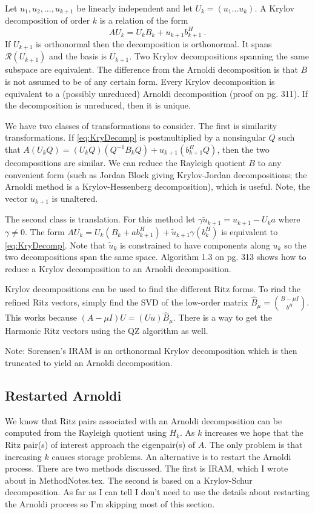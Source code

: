 \documentclass[12pt,twoside]{article}
\newcommand{\cl}[1]{\ensuremath{\mathcal{#1}}}
\begin{document}
Let $u_{1}, u_{2}, ..., u_{k+1}$ be linearly independent and let $U_{k} = (u_{1}...u_{k})$. A Krylov decomposition of order $k$ is a relation of the form 
\begin{equation}
   AU_{k} = U_{k}B_{k} + u_{k+1}b_{k+1}^{H} \:. 
   \label{eq:KryDecomp}
\end{equation}
If $U_{k+1}$ is orthonormal then the decomposition is orthonormal. It spans $\cl{R}(U_{k+1})$ and the basis is $U_{k+1}$. Two Krylov decompositions spanning the same subspace are equivalent. The difference from the Arnoldi decomposition is that $B$ is not assumed to be of any certain form. Every Krylov decomposition is equivalent  to a (possibly unreduced) Arnoldi decomposition (proof on pg. 311). If the decomposition is unreduced, then it is unique. 

We have two classes of transformations to consider. The first is similarity transformations. If \eqref{eq:KryDecomp} is postmultiplied by a nonsingular $Q$ such that $A(U_{k}Q) = (U_{k}Q)(Q^{-1}B_{k}Q) + u_{k+1}(b_{k+1}^{H}Q)$, then the two decompositions are similar. We can reduce the Rayleigh quotient $B$ to any convenient form (such as Jordan Block giving Krylov-Jordan decompositions; the Arnoldi method is a Krylov-Hessenberg decomposition), which is useful. Note, the vector $u_{k+1}$ is unaltered. 

The second class is translation. For this method let $\gamma \tilde{u}_{k+1} = u_{k+1} - U_{k}a$ where $\gamma \ne 0$. The form $AU_{k} = U_{k}(B_{k} + ab_{k+1}^{H}) + \tilde{u}_{k+1}\gamma (b_{k}^{H})$ is equivalent to \eqref{eq:KryDecomp}. Note that $\tilde{u}_{k}$ is constrained to have components along $u_{k}$ so the two decompositions span the same space. Algorithm 1.3 on pg. 313 shows how to reduce a Krylov decomposition to an Arnoldi decomposition. 

Krylov decompositions can be used to find the different Ritz forms. To rind the refined Ritz vectors, simply find the SVD of the low-order matrix $\hat{B}_{\mu} = \binom{B-\mu I}{b^{H}}$. This works because $(A - \mu I)U = (U u)\hat{B}_{\mu}$. There is a way to get the Harmonic Ritz vectors using the QZ algorithm as well. 

Note: Sorensen's IRAM is an orthonormal Krylov decomposition which is then truncated to yield an Arnoldi decomposition. 

\subsection{Restarted Arnoldi}
We know that Ritz pairs associated with an Arnoldi decomposition can be computed from the Rayleigh quotient using $H_{k}$. As $k$ increases we hope that the Ritz pair(s) of interest approach the eigenpair(s) of $A$. The only problem is that increasing $k$ causes storage problems. An alternative is to restart the Arnoldi process. There are two methods discussed. The first is IRAM, which I wrote about in MethodNotes.tex. The second is based on a Krylov-Schur decomposition. As far as I can tell I don't need to use the details about restarting the Arnoldi procees so I'm skipping most of this section.
\end{document}
